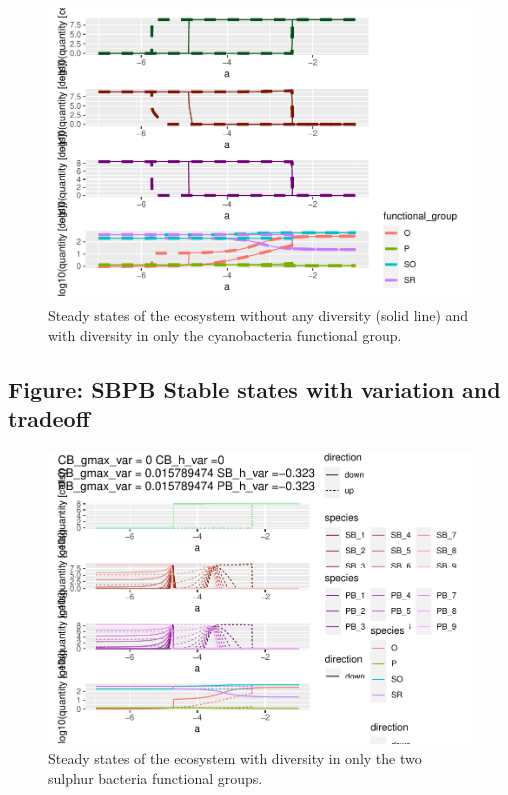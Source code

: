 \documentclass{article}
\begin{document}
\begin{figure}

{\centering \includegraphics[width=1\linewidth]{article_files/figure-latex/CB_var2-1} 

}

\caption{Steady states of the ecosystem without any diversity (solid line) and with diversity in only the cyanobacteria functional group.}\label{fig:CB_var2}
\end{figure}

\hypertarget{figure-sbpb-stable-states-with-variation-and-tradeoff}{%
\subsection{Figure: SBPB Stable states with variation and
tradeoff}\label{figure-sbpb-stable-states-with-variation-and-tradeoff}}

\begin{figure}

{\centering \includegraphics[width=1\linewidth]{article_files/figure-latex/SBPB_var1-1} 

}

\caption{Steady states of the ecosystem with diversity in only the two sulphur bacteria functional groups.}\label{fig:SBPB_var1}
\end{figure}
\end{document}
